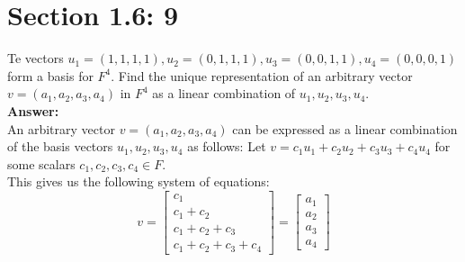 \documentclass{article}
\begin{document}
\section*{Section 1.6: 9}
Te vectors $u_1 = (1,1,1,1), u_2 = (0,1,1,1), u_3 = (0,0,1,1), u_4 = (0,0,0,1)$ form a basis for $F^4$. Find the unique representation of an arbitrary vector $v = (a_1,a_2,a_3,a_4)$ in $F^4$ as a linear combination of $u_1 , u_2 , u_3 , u_4$.\\
\textbf{Answer:}\\
An arbitrary vector $v = (a_1,a_2,a_3,a_4)$ can be expressed as a linear combination of the basis vectors $u_1, u_2, u_3, u_4$ as follows:
Let $v = c_1 u_1 + c_2 u_2 + c_3 u_3 + c_4 u_4$ for some scalars $c_1, c_2, c_3, c_4 \in F$.\\
This gives us the following system of equations:
$$ v = \begin{bmatrix}
    c_1 \\
    c_1 + c_2 \\
    c_1 + c_2 + c_3 \\
    c_1 + c_2 + c_3 + c_4
\end{bmatrix} = \begin{bmatrix}
    a_1 \\
    a_2 \\
    a_3 \\
    a_4
\end{bmatrix}
$$
\end{document}
